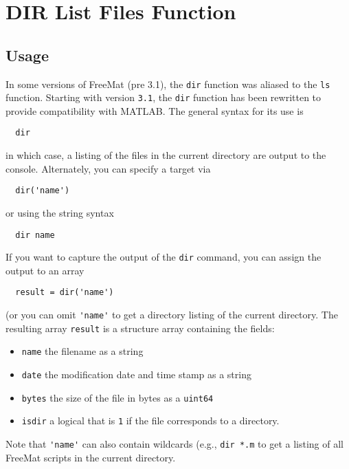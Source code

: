 \section{DIR List Files Function}

\subsection{Usage}

In some versions of FreeMat (pre 3.1), the \verb|dir| function was aliased
to the \verb|ls| function.  Starting with version \verb|3.1|, the \verb|dir| function
has been rewritten to provide compatibility with MATLAB.  The general syntax
for its use is
\begin{verbatim}
  dir
\end{verbatim}
in which case, a listing of the files in the current directory are output to the
console.  Alternately, you can specify a target via
\begin{verbatim}
  dir('name')
\end{verbatim}
or using the string syntax
\begin{verbatim}
  dir name
\end{verbatim}
If you want to capture the output of the \verb|dir| command, you can assign the output
to an array
\begin{verbatim}
  result = dir('name')
\end{verbatim}
(or you can omit \verb|'name'| to get a directory listing of the current directory.  The
resulting array \verb|result| is a structure array containing the fields:
\begin{itemize}
\item  \verb|name| the filename as a string

\item  \verb|date| the modification date and time stamp as a string

\item  \verb|bytes| the size of the file in bytes as a \verb|uint64|

\item  \verb|isdir| a logical that is \verb|1| if the file corresponds to a directory.

\end{itemize}
Note that \verb|'name'| can also contain wildcards (e.g., \verb|dir *.m| to get a listing of
all FreeMat scripts in the current directory.
